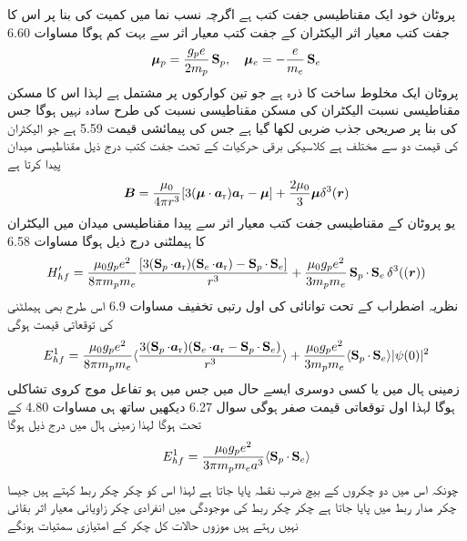 پروٹان خود ایک مقناطیسی جفت کتب  ہے اگرچہ نسب نما میں کمیت کی بنا پر اس کا جفت کتب معیار اثر الیکٹران کے جفت کتب معیار اثر سے بہت کم ہوگا مساوات 6.60 
\begin{align}
{\ensuremath{{\boldsymbol{\mu}}}}_p = \frac{g_p e}{2 m_p} \operatorname{\mathbf{S}}_p, \quad {\ensuremath{{\boldsymbol{\mu}}}}_e = - \frac{e}{m_e} \operatorname{\mathbf{S}}_e
\end{align}
پروٹان ایک مخلوط ساخت کا ذرہ ہے جو تین کوارکوں پر مشتمل ہے لہذا اس کا مسکن مقناطیسی نسبت الیکٹران کی مسکن مقناطیسی نسبت کی طرح سادہ نہیں ہوگا جس کی بنا پر  صريحى  جذب ضربی  لکھا گیا ہے جس کی پیمائشی قیمت 5.59 ہے جو الیکٹران کی قیمت دو سے مختلف ہے کلاسیکی برقی حرکیات کے تحت جفت کتب   درج ذیل مقناطیسی میدان پیدا کرتا ہے 
\begin{align}
{\ensuremath{{\boldsymbol{B}}}} = \frac{\mu_0}{4 \pi r^3} [3 ({{\boldsymbol{\mu}}} \cdot {\ensuremath{{\boldsymbol{a}}}_{\textup{r}}}) {{\boldsymbol{a}}_{\textup{r}}} - {{\boldsymbol{\mu}}}] + \frac{2 \mu_0}{3} {{\boldsymbol{\mu}}} \delta^3 ({{\boldsymbol{r}}})
\end{align}
یو پروٹان کے مقناطیسی جفت کتب معیار اثر سے پیدا مقناطیسی میدان میں الیکٹران کا ہیملٹنی درج ذیل ہوگا مساوات 6.58 
\begin{align}
H'_{hf} = \frac{\mu_0 g_p e^2}{8 \pi m_p m_e} \frac{[3(\operatorname{\mathbf{S}}_p \cdot {\ensuremath{{\boldsymbol{a}}}_{\textup{r}}})(\operatorname{\mathbf{S}}_e \cdot {\ensuremath{{\boldsymbol{a}}}_{\textup{r}}}) - \operatorname{\mathbf{S}}_p \cdot \operatorname{\mathbf{S}}_e]}{r^3} + \frac{\mu_0 g_p e^2}{3m_p m_e} \operatorname{\mathbf{S}}_p \cdot \operatorname{\mathbf{S}}_e \delta^3 (({{\boldsymbol{r}}}))
\end{align}
نظریہ اضطراب کے تحت توانائی کی اول رتبی تخفیف مساوات 6.9 اس طرح بھی ہيملٹنی کی توقعاتی قیمت ہوگی 
\begin{align}
E_{hf}^1 = \frac{\mu_0 g_p e^2}{8 \pi m_p m_e} \langle \frac{3(\operatorname{\mathbf{S}}_p \cdot {\ensuremath{{\boldsymbol{a}}}_{\textup{r}}})(\operatorname{\mathbf{S}}_e \cdot {\ensuremath{{\boldsymbol{a}}}_{\textup{r}}} - \operatorname{\mathbf{S}}_p \cdot \operatorname{\mathbf{S}}_e)}{r^3} \rangle + \frac{\mu _0 g_p e^2}{3 m_p m_e} \langle \operatorname{\mathbf{S}}_p \cdot \operatorname{\mathbf{S}}_e \rangle |\psi (0)|^2
\end{align}
زمینی ہال میں یا کسی دوسری ایسے حال میں جس میں  ہو تفاعل موج کروی تشاکلی ہوگا لہذا اول توقعاتی قیمت صفر ہوگی سوال 6.27 دیکھیں ساتھ ہی مساوات 4.80 کے تحت  ہوگا لہذا زمینی ہال میں درج ذیل ہوگا 
\begin{align}
E_{hf}^1 = \frac{\mu_0 g_p e^2}{3 \pi m_p m_e a^3} \langle \operatorname{\mathbf{S}}_p \cdot \operatorname{\mathbf{S}}_e \rangle
\end{align}
چونکہ اس میں دو چکروں کے بیچ ضرب نقطہ پایا جاتا ہے لہذا اس کو چکر چکر ربط کہتے ہیں جیسا چکر مدار ربط میں  پایا جاتا ہے چکر چکر ربط کی موجودگی میں انفرادی چکر زاویائی معیار اثر بقائی نہیں رہتے ہیں موزوں حالات کل چکر کے امتیازی سمتیات ہونگے 
